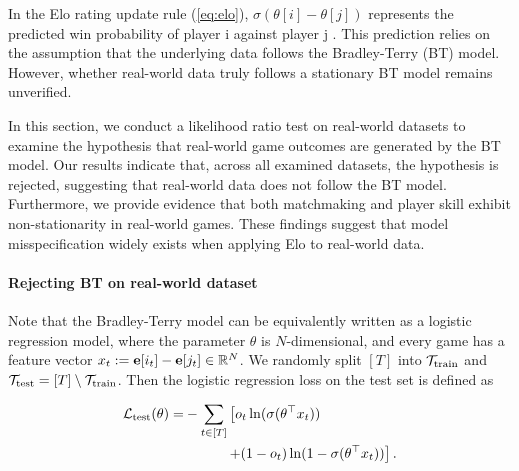 In the Elo rating update rule (\ref{eq:elo}), $\sigma(\theta[i]-\theta[j])$ represents the predicted win probability of player  i  against player  j . This prediction relies on the assumption that the underlying data follows the Bradley-Terry (BT) model. However, whether real-world data truly follows  a stationary BT model remains unverified.

In this section, we conduct a likelihood ratio test on real-world datasets to examine the hypothesis that real-world game outcomes are generated by the BT model. Our results indicate that, across all examined datasets, the hypothesis is rejected, suggesting that real-world data does not follow the BT model. Furthermore, we provide evidence that both matchmaking and player skill exhibit non-stationarity in real-world games. These findings suggest that model misspecification widely exists when applying Elo to real-world data.



\paragraph{Rejecting BT on real-world dataset}


Note that the Bradley-Terry model can be equivalently written as a logistic regression model, where the parameter $\theta$ is $N$-dimensional, and every game has a feature vector $x_t:=\mathbf{e}[i_t]-\mathbf{e}[j_t]\in \mathbb{R}^{N}$. 
We randomly split $[T]$ into $\mathcal{T}_{\rm train}$ and $\mathcal{T}_{\rm test} = [T]\setminus \mathcal{T}_{\rm train}$. Then the logistic regression loss on the test set is defined as

\begin{align*}
\mathcal{L}_{\rm test}(\theta)=& -\sum_{t\in [T]} \left[o_t\ln(\sigma(\theta^\top x_t))\right. \\
& \qquad\quad \left. + (1-o_t)\ln(1-\sigma(\theta^\top x_t))\right].
\end{align*}


